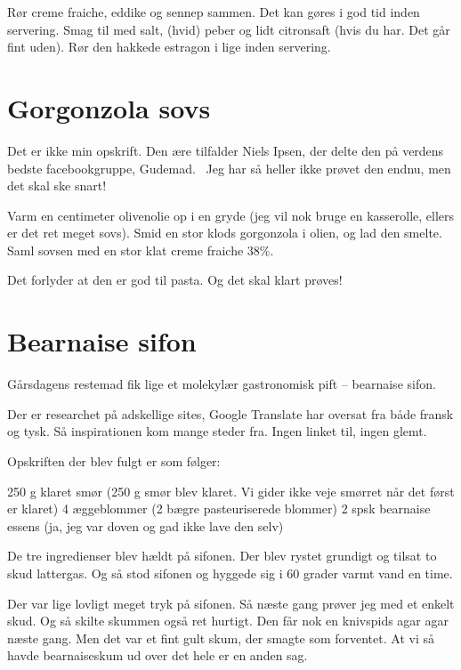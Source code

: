 \documentclass[
  letterpaper,
  DIV=11,
  numbers=noendperiod]{scrreprt}
\begin{document}
Rør creme fraiche, eddike og sennep sammen. Det kan gøres i god tid
inden servering. Smag til med salt, (hvid) peber og lidt citronsaft
(hvis du har. Det går fint uden). Rør den hakkede estragon i lige inden
servering.

\hypertarget{gorgonzola-sovs}{%
\section{Gorgonzola sovs}\label{gorgonzola-sovs}}

Det er ikke min opskrift. Den ære tilfalder Niels Ipsen, der delte den
på verdens bedste facebookgruppe, Gudemad.~ Jeg har så heller ikke
prøvet den endnu, men det skal ske snart!

Varm en centimeter olivenolie op i en gryde (jeg vil nok bruge en
kasserolle, ellers er det ret meget sovs). Smid en stor klods gorgonzola
i olien, og lad den smelte. Saml sovsen med en stor klat creme fraiche
38\%.

Det forlyder at den er god til pasta. Og det skal klart prøves!

\hypertarget{bearnaise-sifon}{%
\section{Bearnaise sifon}\label{bearnaise-sifon}}

Gårsdagens restemad fik lige et molekylær gastronomisk pift -- bearnaise
sifon.~

Der er researchet på adskellige sites, Google Translate har oversat fra
både fransk og tysk. Så inspirationen kom mange steder fra. Ingen linket
til, ingen glemt.

Opskriften der blev fulgt er som følger:

250 g klaret smør (250 g smør blev klaret. Vi gider ikke veje smørret
når det først er klaret) 4 æggeblommer (2 bægre pasteuriserede blommer)
2 spsk bearnaise essens (ja, jeg var doven og gad ikke lave den selv)

De tre ingredienser blev hældt på sifonen. Der blev rystet grundigt og
tilsat to skud lattergas. Og så stod sifonen og hyggede sig i 60 grader
varmt vand en time.

Der var lige lovligt meget tryk på sifonen. Så næste gang prøver jeg med
et enkelt skud. Og så skilte skummen også ret hurtigt. Den får nok en
knivspids agar agar næste gang. Men det var et fint gult skum, der
smagte som forventet. At vi så havde bearnaiseskum ud over det hele er
en anden sag.
\end{document}
